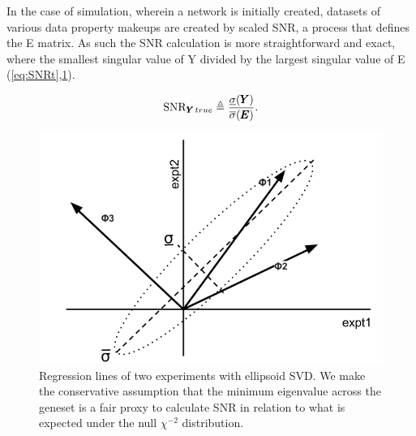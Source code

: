 In the case of simulation, wherein a network is initially created, datasets of various data property makeups are created by scaled SNR, a process that defines the E matrix. As such the SNR calculation is more straightforward and exact, where the smallest singular value of Y divided by the largest singular value of E (\cref{eq:SNRt},\cref{fig:SNR}).

\begin{equation}
    \operatorname{SNR}_{{\pmb{Y}}\,true} \triangleq \frac{\underline{\sigma}({\pmb{Y}})}{\overline{\sigma}({\pmb{E}})}.
  \label{eq:SNRt}
\end{equation} 

\begin{figure}[H]
  \begin{center}
    \includegraphics[width=1\linewidth]{4/matrixSNR.png}
  \end{center}
  \caption{Regression lines of two experiments with ellipsoid SVD. We make the conservative assumption that the minimum eigenvalue across the geneset is a fair proxy to calculate SNR in relation to what is expected under the null $\chi^{-2}$ distribution.}
  \label{fig:SNR}
\end{figure}

